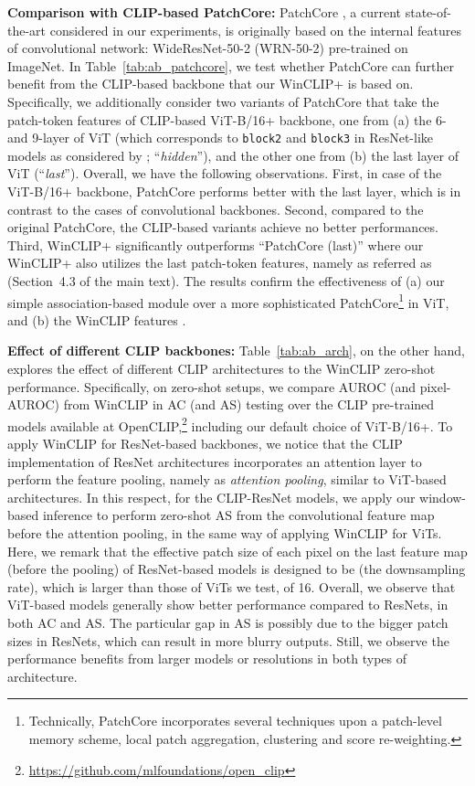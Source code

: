 \noindent\textbf{Comparison with CLIP-based PatchCore: } 
PatchCore \cite{roth2022towards}, a current state-of-the-art considered in our experiments, is originally based on the internal features of convolutional network: \eg WideResNet-50-2 (WRN-50-2)  \cite{zagoruyko2016wideresnet} pre-trained on ImageNet.   
In Table~\ref{tab:ab_patchcore}, we test whether PatchCore can further benefit from the CLIP-based backbone that our WinCLIP+ is based on. Specifically, we additionally consider two variants of PatchCore that take the patch-token features of CLIP-based ViT-B/16+ backbone, one from (a) the 6- and 9-layer of ViT (which corresponds to \texttt{block2} and \texttt{block3} in ResNet-like models as considered by \cite{roth2022towards}; ``\emph{hidden}''), and the other one from (b) the last layer of ViT (``\emph{last}''). Overall, we have the following observations. First, in case of the ViT-B/16+ backbone, PatchCore performs better with the last layer, which is in contrast to the cases of convolutional backbones. Second, compared to the original PatchCore, the CLIP-based variants achieve no better performances. Third, WinCLIP+ significantly outperforms ``PatchCore (last)'' where our WinCLIP+ also utilizes the last patch-token features, namely as referred as  (Section~4.3 of the main text). The results confirm the effectiveness of (a) our simple association-based module over a more sophisticated PatchCore\footnote{Technically, PatchCore incorporates several techniques upon a patch-level memory scheme, \eg local patch aggregation, clustering and score re-weighting.} in ViT, and (b) the WinCLIP features .


\vspace{0.05in}
\noindent\textbf{Effect of different CLIP backbones: }
Table~\ref{tab:ab_arch}, on the other hand, explores the effect of different CLIP architectures to the WinCLIP zero-shot performance. Specifically, on zero-shot setups, we compare AUROC (and pixel-AUROC) from WinCLIP in AC (and AS) testing over the CLIP pre-trained models available at OpenCLIP,\footnote{\url{https://github.com/mlfoundations/open_clip}} including our default choice of ViT-B/16+. To apply WinCLIP for ResNet-based backbones, we notice that the CLIP implementation of ResNet architectures incorporates an attention layer to perform the feature pooling, namely as \emph{attention pooling}, similar to ViT-based architectures. In this respect, for the CLIP-ResNet models, we apply our window-based inference to perform zero-shot AS from the convolutional feature map before the attention pooling, in the same way of applying WinCLIP for ViTs. Here, we remark that the effective patch size of each pixel on the last feature map (before the pooling) of ResNet-based models is designed to be  (the downsampling rate), which is larger than those of ViTs we test, \eg of 16. Overall, we observe that ViT-based models generally show better performance compared to ResNets, in both AC and AS. The particular gap in AS is possibly due to the bigger patch sizes in ResNets, which can result in more blurry outputs. Still, we observe the performance benefits from larger models or resolutions in both types of architecture.

